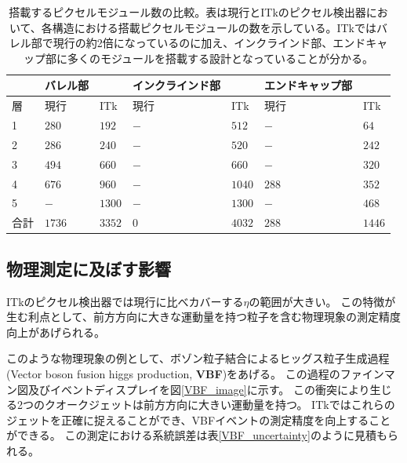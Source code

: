 \begin{table}[tbp]
\begin{center}
\caption[搭載するピクセルモジュール数の比較]{搭載するピクセルモジュール数の比較。表は現行とITkのピクセル検出器において、各構造における搭載ピクセルモジュールの数を示している。ITkではバレル部で現行の約2倍になっているのに加え、インクラインド部、エンドキャップ部に多くのモジュールを搭載する設計となっていることが分かる。}
\label{compare_itk_modules}
  \begin{tabular}{|l||ll|ll|ll|} \hline
          & バレル部 &            & インクラインド部 & & エンドキャップ部 & \\ \hline 
    層    & 現行     & ITk        & 現行& ITk          & 現行  & ITk \\ \hline
    1     & $280$    & $192$      & $-$ & $512$        & $-$   & $64$ \\ 
    2     & $286$    & $240$      & $-$ & $520$        & $-$   & $242$ \\ 
    3     & $494$    & $660$      & $-$ & $660$        & $-$   & $320$ \\ 
    4     & $676$    & $960$      & $-$ & $1040$       & $288$ & $352$ \\ 
    5     & $-$      & $1300$     & $-$ & $1300$       & $-$   & $468$ \\ \hline
    合計  & $1736$   & $3352$     & $0$ & $4032$       & $288$ & $1446$ \\ \hline\hline
  \end{tabular}
\end{center}
\end{table}

\subsection{物理測定に及ぼす影響}
ITkのピクセル検出器では現行に比べカバーする$\eta$の範囲が大きい。
この特徴が生む利点として、前方方向に大きな運動量を持つ粒子を含む物理現象の測定精度向上があげられる。

このような物理現象の例として、ボゾン粒子結合によるヒッグス粒子生成過程(Vector boson fusion higgs production, \textbf{VBF})をあげる。
この過程のファインマン図及びイベントディスプレイを図\ref{VBF_image}に示す。
この衝突により生じる2つのクオークジェットは前方方向に大きい運動量を持つ。
ITkではこれらのジェットを正確に捉えることができ、VBFイベントの測定精度を向上することができる。
この測定における系統誤差は表\ref{VBF_uncertainty}のように見積もられる\cite{1-3}。

